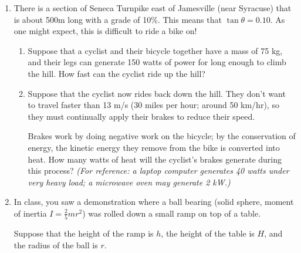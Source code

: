 \documentclass[12pt]{article}
\begin{document}
\begin{enumerate}
\begin{enumerate}
	\end{enumerate}


\newpage

\item There is a section of Seneca Turnpike east of Jamesville (near Syracuse) that is about 500m long with a grade of 10\%. This means that $\tan \theta = 0.10$. As one might expect, this is difficult to ride a bike on!

\begin{enumerate} 
	\item Suppose that a cyclist and their bicycle together have a mass of 75 kg, and their legs can generate 150 watts of power for long enough to climb the hill. How fast can the cyclist ride up the hill?

	\item Suppose that the cyclist now rides back down the hill. They don't want to travel faster than 13 m/s (30 miles per hour; around 50 km/hr), so they must continually apply their brakes to reduce their speed.
	
	Brakes work by doing negative work on the bicycle; by the conservation of energy, the kinetic energy they remove from the bike is converted into heat. How many watts of heat will the cyclist's brakes generate during this process? {\it (For reference: a laptop computer generates 40 watts under very heavy load; a microwave oven may generate 2 kW.)}

\end{enumerate}
\vspace{0.5in}

\item In class, you saw a demonstration where a ball bearing (solid sphere, moment of inertia $I=\frac{2}{5}mr^2$) was rolled down a small ramp on top of a table. 


\begin{minipage}{0.5\textwidth}
	Suppose that the height of the ramp is $h$, the height of the table is $H$, and the radius of the ball is $r$.
	

\end{minipage}
\end{enumerate}
\end{document}

